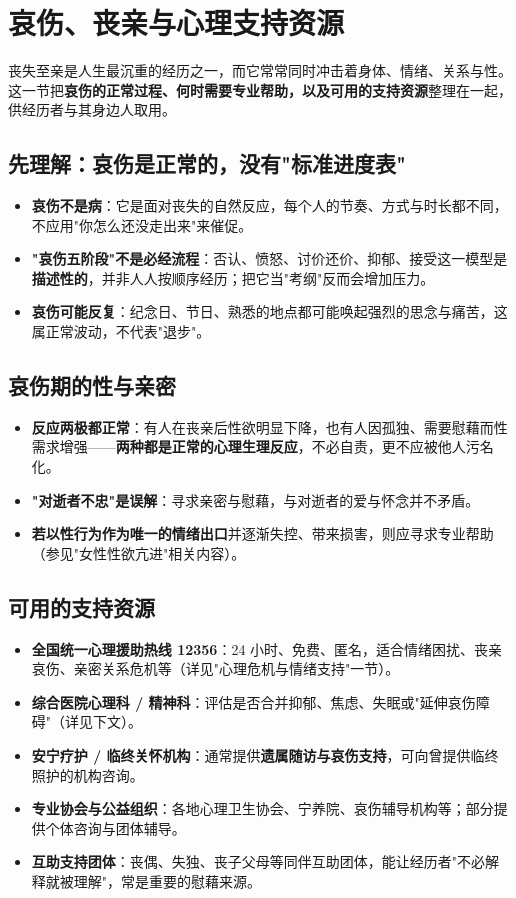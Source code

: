\section{哀伤、丧亲与心理支持资源}

丧失至亲是人生最沉重的经历之一，而它常常同时冲击着身体、情绪、关系与性。这一节把\textbf{哀伤的正常过程、何时需要专业帮助，以及可用的支持资源}整理在一起，供经历者与其身边人取用。

\subsection{先理解：哀伤是正常的，没有"标准进度表"}

\begin{itemize}
	\item \textbf{哀伤不是病}：它是面对丧失的自然反应，每个人的节奏、方式与时长都不同，不应用"你怎么还没走出来"来催促。
	\item \textbf{"哀伤五阶段"不是必经流程}：否认、愤怒、讨价还价、抑郁、接受这一模型是\textbf{描述性的}，并非人人按顺序经历；把它当"考纲"反而会增加压力。
	\item \textbf{哀伤可能反复}：纪念日、节日、熟悉的地点都可能唤起强烈的思念与痛苦，这属正常波动，不代表"退步"。
\end{itemize}

\subsection{哀伤期的性与亲密}

\begin{itemize}
	\item \textbf{反应两极都正常}：有人在丧亲后性欲明显下降，也有人因孤独、需要慰藉而性需求增强——\textbf{两种都是正常的心理生理反应}，不必自责，更不应被他人污名化。
	\item \textbf{"对逝者不忠"是误解}：寻求亲密与慰藉，与对逝者的爱与怀念并不矛盾。
	\item \textbf{若以性行为作为唯一的情绪出口}并逐渐失控、带来损害，则应寻求专业帮助（参见"女性性欲亢进"相关内容）。
\end{itemize}

\subsection{可用的支持资源}

\begin{itemize}
	\item \textbf{全国统一心理援助热线 12356}：24 小时、免费、匿名，适合情绪困扰、丧亲哀伤、亲密关系危机等（详见"心理危机与情绪支持"一节）。
	\item \textbf{综合医院心理科 / 精神科}：评估是否合并抑郁、焦虑、失眠或"延伸哀伤障碍"（详见下文）。
	\item \textbf{安宁疗护 / 临终关怀机构}：通常提供\textbf{遗属随访与哀伤支持}，可向曾提供临终照护的机构咨询。
	\item \textbf{专业协会与公益组织}：各地心理卫生协会、宁养院、哀伤辅导机构等；部分提供个体咨询与团体辅导。
	\item \textbf{互助支持团体}：丧偶、失独、丧子父母等同伴互助团体，能让经历者"不必解释就被理解"，常是重要的慰藉来源。
\end{itemize}

